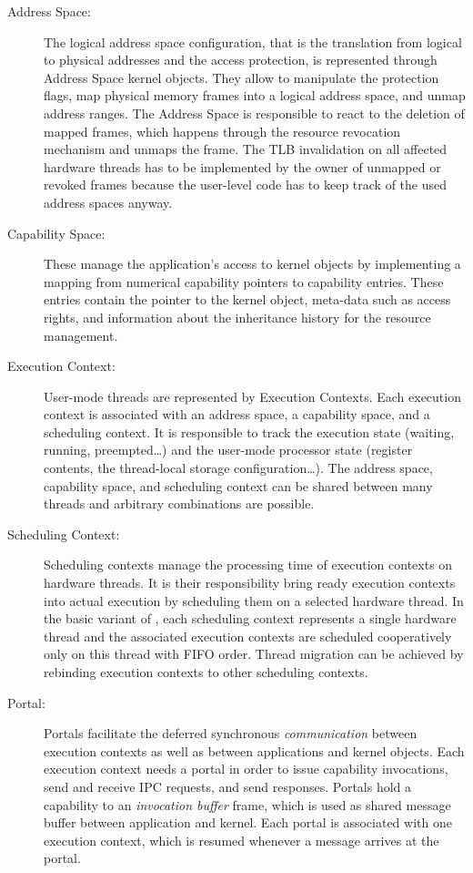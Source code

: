 \begin{description}
\item[Address Space:]
The logical address space configuration, that is the translation from logical to physical addresses and the access protection, is represented through Address Space kernel objects. They allow to manipulate the protection flags, map physical memory frames into a logical address space, and unmap address ranges. The Address Space is responsible to react to the deletion of mapped frames, which happens through the resource revocation mechanism and unmaps the frame. The TLB invalidation on all affected hardware threads has to be implemented by the owner of unmapped or revoked frames because the user-level code has to keep track of the used address spaces anyway.

\item[Capability Space:] These manage the application's access to kernel objects by implementing a mapping from numerical capability pointers to capability entries. These entries contain the pointer to the kernel object, meta-data such as access rights, and information about the inheritance history for the resource management.  

\item[Execution Context:] User-mode threads are represented by Execution Contexts. Each execution context is associated with an address space, a capability space, and a scheduling context. It is responsible to track the execution state (waiting, running, preempted\ldots) and the user-mode processor state (register contents, the thread-local storage configuration\ldots). The address space, capability space, and scheduling context can be shared between many threads and arbitrary combinations are possible.

\item[Scheduling Context:]
Scheduling contexts manage the processing time of execution contexts on hardware threads. It is their responsibility bring ready execution contexts into actual execution by scheduling them on a selected hardware thread. 
In the basic variant of \mythos, each scheduling context represents a single hardware thread and the associated execution contexts are scheduled cooperatively only on this thread with FIFO order. Thread migration can be achieved by rebinding execution contexts to other scheduling contexts.

\item[Portal:] 
Portals facilitate the deferred synchronous \emph{communication} between execution contexts as well as between applications and kernel objects. Each execution context needs a portal in order to issue capability invocations, send and receive IPC requests, and send responses. Portals hold a capability to an \emph{invocation buffer} frame, which is used as shared message buffer between application and kernel. Each portal is associated with one execution context, which is resumed whenever a message arrives at the portal.


\end{description}
